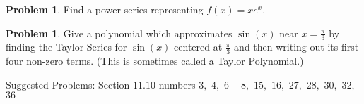 \documentclass[letterpaper, twoside, 12pt]{book}
\theoremstyle{definition}
\theoremstyle{definition}
\newtheorem{problem}[theorem]{Problem}
\begin{document}
\newpage

\begin{problem}
 Find a power series representing $f(x) = x e^x$.
\end{problem}

\vfill

\begin{problem}
 Give a polynomial which approximates $\sin(x)$ near $x=\frac{\pi}{3}$ by
 finding the Taylor Series for $\sin\left(x\right)$ centered at $\frac{\pi}{3}$
 and then writing out its first four non-zero terms. (This is sometimes called
 a Taylor Polynomial.)
\end{problem}

\vfill



\noindent Suggested Problems: Section $11.10$ numbers $3,$ $4,$ $6 - 8,$ $15,$ $16,$ $27,$ $28,$ $30,$ $32,$ $36$
\end{document}
